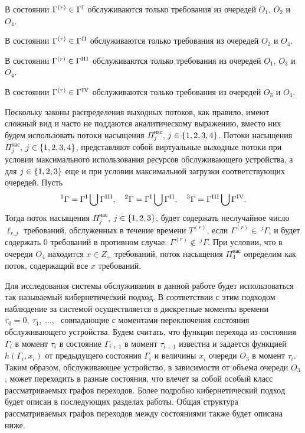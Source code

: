 \documentclass[a4paper,14pt,russian]{article}
\newcommand{\G}{\Gamma}
\newcommand{\ga}[1]{\Gamma^{\left( #1 \right)} }
\newcommand{\Tt}[1]{T^{\left( #1 \right)} }
\begin{document}
В состоянии $\G^{(r)} \in \G^{\mathrm{\Rmnum{1}}}$ обслуживаются только требования из очередей $O_1$, $O_2$ и $O_4$.

В состоянии $\G^{(r)} \in \G^{\mathrm{\Rmnum{2}}}$ обслуживаются только требования из очередей $O_2$ и $O_4$.

В состоянии $\G^{(r)} \in \G^{\mathrm{\Rmnum{3}}}$ обслуживаются только требования из очередей $O_1$, $O_3$ и $O_4$.

В состоянии $\G^{(r)} \in \G^{\mathrm{\Rmnum{4}}}$ обслуживаются только требования из очередей $O_3$ и $O_4$.

Поскольку законы распределения выходных потоков, как правило, имеют сложный вид и часто не поддаются аналитическому выражению, вместо них будем использовать потоки насыщения $\Pi^{\mathrm{\text{нас}}}_j$, $j \in \left\{1,2,3,4\right\}$. Потоки насыщения $\Pi^{\mathrm{\text{нас}}}_j$, $j \in \left\{1,2,3,4\right\}$, представляют собой виртуальные выходные потоки при условии максимального использования ресурсов обслуживающего устройства, а для $j\in \left\{1, 2, 3\right\}$ еще и при условии максимальной загрузки соответствующих очередей. Пусть
\begin{equation}
^1\G=\G^{\mathrm{\Rmnum{1}}} \bigcup \G^{\mathrm{\Rmnum{3}}}, \quad
^2\G=\G^{\mathrm{\Rmnum{1}}} \bigcup \G^{\mathrm{\Rmnum{2}}}, \quad
^3\G=\G^{\mathrm{\Rmnum{3}}} \bigcup \G^{\mathrm{\Rmnum{4}}}.
\end{equation}
Тогда поток насыщения $\Pi^{\mathrm{\text{нас}}}_j$, $j\in \left\{1,2,3\right\}$, будет содержать неслучайное число $\ell_{r,j}$ требований, обслуженных в течение времени $\Tt{r}$, если $\ga{r} \in~^j\G$, и будет содержать $0$ требований в противном случае: $\ga{r} \notin ~^j\G$. При условии, что в очереди $O_4$ находится $x \in Z_+$ требований, поток насыщения $\Pi^{\mathrm{\text{нас}}}_4$ определим как поток, содержащий все $x$ требований.

Для исследования системы обслуживания в данной работе будет использоваться так называемый кибернетический подход. В соответствии с этим подходом наблюдение за системой осуществляется в дискретные моменты времени $\tau_0 = 0,~ \tau_1,~ \ldots$,~  совпадающие с моментами переключения состояния обслуживающего устройства. 
Будем считать, что функция перехода из состояния $\G_i$ в момент $\tau_i$ в состояние $\G_{i+1}$ в момент $\tau_{i+1}$ известна и задается функцией $h(\G_i,x_i)$ от предыдущего состояния $\G_i$ и величины $x_i$ очереди $O_3$ в момент $\tau_i$. Таким образом, обслуживающее устройство, в зависимости от объема очереди $O_3$, может переходить в разные состояния, что влечет за собой особый класс рассматриваемых графов переходов. Более подробно кибернетический подход будет описан в последующих разделах работы. Общая структура рассматриваемых графов переходов между состояниями также будет описана ниже. 
\end{document}
